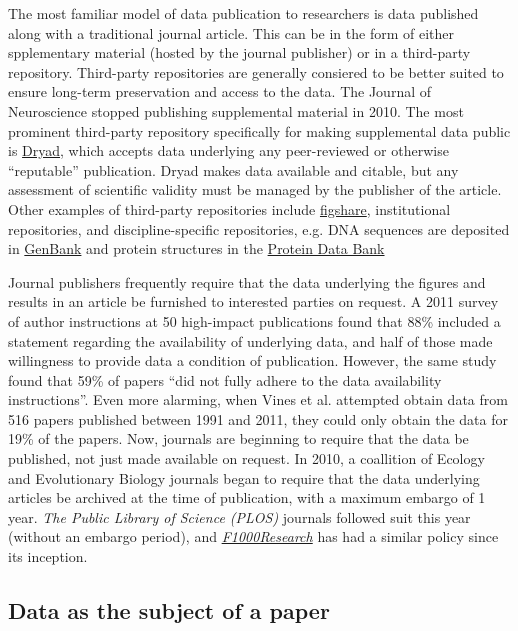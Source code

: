 \documentclass[10pt,twocolumn]{article}
\begin{document}
The most familiar model of data publication to researchers is data published along with a traditional journal article. 
This can be in the form of either spplementary material (hosted by the journal publisher) or in a third-party repository.
Third-party repositories are generally consiered to be better suited to ensure long-term preservation and access to the data.
The Journal of Neuroscience stopped publishing supplemental material in 2010.\cite{maunsell_announcement_2010}
The most prominent third-party repository specifically for making supplemental data public is \href{http://www.datadryad.org/}{Dryad}, which accepts data underlying any peer-reviewed or otherwise ``reputable'' publication. 
Dryad makes data available and citable, but any assessment of scientific validity must be managed by the publisher of the article.
Other examples of third-party repositories include \href{http://figshare.com/}{figshare}, institutional repositories, and discipline-specific repositories, e.g. DNA sequences are deposited in \href{http://www.ncbi.nlm.nih.gov/genbank/}{GenBank}\cite{benson_genbank_2013} and protein structures in the \href{http://www.rcsb.org/}{Protein Data Bank}\cite{berman_protein_2000}

Journal publishers frequently require that the data underlying the figures and results in an article be furnished to interested parties on request.
A 2011 survey of author instructions at 50 high-impact publications found that 88\% included a statement regarding the availability of underlying data, and half of those made willingness to provide data a condition of publication.\cite{alsheikh-ali_public_2011}
However, the same study found that 59\% of papers ``did not fully adhere to the data availability instructions''.
Even more alarming, when Vines et al. attempted obtain data from 516 papers published between 1991 and 2011, they could only obtain the data for 19\% of the papers.\cite{vines_availability_2014}
Now, journals are beginning to require that the data be published, not just made available on request.
In 2010, a coallition of Ecology and Evolutionary Biology journals began to require that the data underlying articles be archived at the time of publication, with a maximum embargo of 1 year.\cite{whitlock_data_2010, fairbairn_advent_2010}
{\emph{The Public Library of Science (PLOS)}} journals followed suit this year (without an embargo period)\cite{bloom_data_2014}, and \href{http://f1000research.com}{\emph{F1000Research}} has had a similar policy since its inception.

 
\subsection*{Data as the subject of a paper}\label{paper-subject-data}
\end{document}

